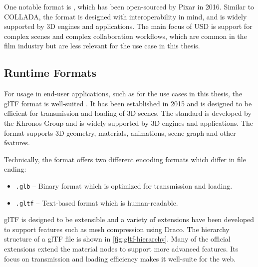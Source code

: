 One notable format is , which has been open-sourced by Pixar in 2016. Similar to \gls{COLLADA}, the format is designed with interoperability in mind, and is widely supported by 3D engines and applications. The main focus of \gls{USD} is support for complex scenes and complex collaboration workflows, which are common in the film industry but are less relevant for the use case in this thesis.

\subsection*{Runtime Formats}

For usage in end-user applications, such as for the use cases in this thesis, the \gls{glTF} format is well-suited \cite{gltfSpecification}. It has been established in 2015 and is designed to be efficient for transmission and loading of 3D scenes. The standard is developed by the \gls{Khronos Group} and is widely supported by 3D engines and applications. The format supports 3D geometry, materials, animations, scene graph and other features.

Technically, the format offers two different encoding formats which differ in file ending:

\begin{itemize}
    \item{\texttt{.glb}} – Binary format which is optimized for transmission and loading.
    \item{\texttt{.gltf}} – Text-based format which is human-readable.
\end{itemize}

\gls{glTF} is designed to be extensible and a variety of extensions have been developed to support features such as mesh compression using Draco. The hierarchy structure of a \gls{glTF} file is shown in \autoref{fig:gltf-hierarchy}. Many of the official extensions extend the material nodes to support more advanced features. Its focus on transmission and loading efficiency makes it well-suite for the web.

